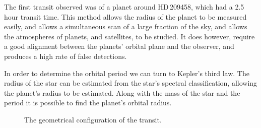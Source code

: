 The first transit observed was of a planet around HD\,209458, which
had a 2.5\,hour transit time. This method allows the radius of the
planet to be measured easily, and allows a simultaneous scan of a
large fraction of the sky, and allows the atmospheres of planets, and
satellites, to be studied. It does however, require a good alignment
between the planets' orbital plane and the observer, and produces a
high rate of false detections.

In order to determine the orbital period we can turn to Kepler's third
law. The radius of the star can be estimated from the star's spectral
classification, allowing the planet's radius to be estimated. Along
with the mass of the star and the period it is possible to find the
planet's orbital radius.

\begin{figure}[b]
  \centering
  \caption{The geometrical configuration of the transit.}
  \label{fig:transit-geometry}
\end{figure}

